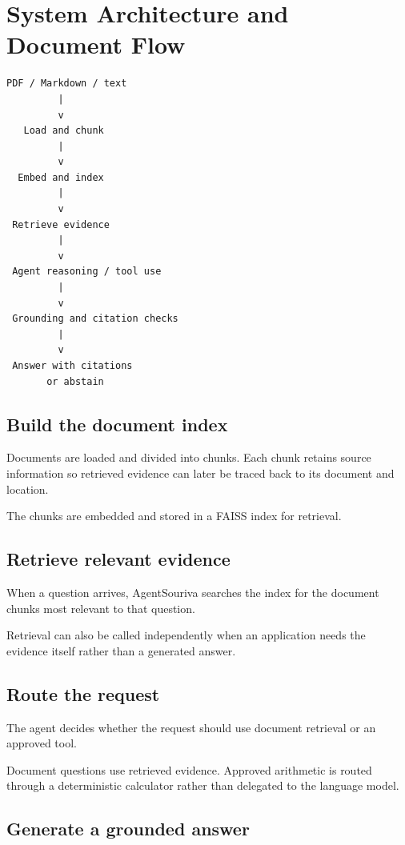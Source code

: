 
\section{System Architecture and Document Flow}

\begin{verbatim}
PDF / Markdown / text
         |
         v
   Load and chunk
         |
         v
  Embed and index
         |
         v
 Retrieve evidence
         |
         v
 Agent reasoning / tool use
         |
         v
 Grounding and citation checks
         |
         v
 Answer with citations
       or abstain
\end{verbatim}

\subsection{Build the document index}

Documents are loaded and divided into chunks. Each chunk retains source information so retrieved evidence can later be traced back to its document and location.

The chunks are embedded and stored in a FAISS index for retrieval.

\subsection{Retrieve relevant evidence}

When a question arrives, AgentSouriva searches the index for the document chunks most relevant to that question.

Retrieval can also be called independently when an application needs the evidence itself rather than a generated answer.

\subsection{Route the request}

The agent decides whether the request should use document retrieval or an approved tool.

Document questions use retrieved evidence. Approved arithmetic is routed through a deterministic calculator rather than delegated to the language model.

\subsection{Generate a grounded answer}

